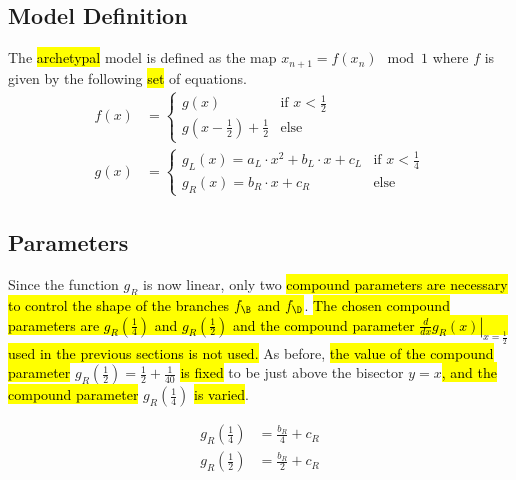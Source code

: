 \subsection{Model Definition}
\label{sec:setup.arch.definition}

The \hl{archetypal} model is defined as the map $x_{n+1} = f(x_n) \mod 1$ where $f$ is given by the following \hl{set} of equations.
\begin{align}
	f(x) & = \begin{cases}
		         g(x)                             & \text{if } x < \frac{1}{2} \\
		         g(x - \frac{1}{2}) + \frac{1}{2} & \text{else}
	         \end{cases} \label{equ:arch.f}           \\
	g(x) & = \begin{cases}
		         g_L(x) = a_L \cdot x^2 + b_L \cdot x + c_L & \text{if } x < \frac{1}{4} \\
		         g_R(x) = b_R \cdot x + c_R                 & \text{else}
	         \end{cases} \label{equ:arch.g}
\end{align}

\subsection{Parameters}
\label{sec:setup.arch.parameters}

Since the function $g_R$ is now linear, only two \hl{compound parameters are necessary to control the shape of the branches $f_\B$ and $f_\D$}.
\hl{
The chosen compound parameters are $g_R\left(\frac{1}{4}\right)$ and $g_R\left(\frac{1}{2}\right)$ and the compound parameter $\left. \frac{d}{dx} g_R(x) \right|_{x = \frac{1}{2}}$ used in the previous sections is not used.
}
As before, \hl{the value of the compound parameter} $g_R\left(\frac{1}{2}\right) = \frac{1}{2} + \frac{1}{40}$ \hl{is fixed} to be just above the bisector $y = x$\hl{, and the compound parameter} $g_R\left(\frac{1}{4}\right)$ \hl{is varied}.

\begin{subequations}
	\begin{align}
		g_R\left(\frac{1}{4}\right) & = \frac{b_R}{4} + c_R \label{equ:setup.arch.A} \\
		g_R\left(\frac{1}{2}\right) & = \frac{b_R}{2} + c_R \label{equ:setup.arch.B}
	\end{align}
\end{subequations}

